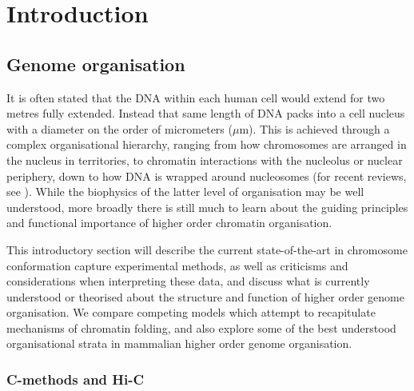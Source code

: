 \documentclass[a4paper,11pt,oneside]{book}
\begin{document}

\chapter{Introduction}
\section{Genome organisation}\label{intro:genomeorg}
%
It is often stated that the DNA within each human cell would extend for two metres fully extended. Instead that same length of DNA packs into a cell nucleus with a diameter on the order of micrometers ($\mu$m). This is achieved through a complex organisational hierarchy, ranging from how chromosomes are arranged in the nucleus in territories, to chromatin interactions with the nucleolus or nuclear periphery, down to how DNA is wrapped around nucleosomes (for recent reviews, see ). While the biophysics of the latter level of organisation may be well understood, more broadly there is still much to learn about the guiding principles and functional importance of higher order chromatin organisation.

This introductory section will describe the current state-of-the-art in chromosome conformation capture experimental methods, as well as criticisms and considerations when interpreting these data, and discuss what is currently understood or theorised about the structure and function of higher order genome organisation. We compare competing models which attempt to recapitulate mechanisms of chromatin folding, and also explore some of the best understood organisational strata in mammalian higher order genome organisation.

%

\subsection{C-methods and Hi-C}
\end{document}
